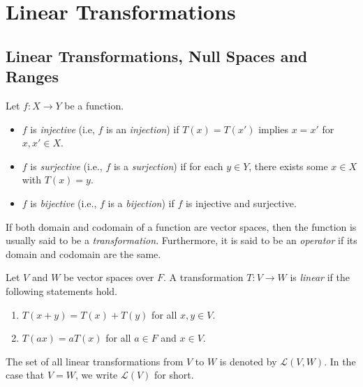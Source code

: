 \chapter{Linear Transformations}
\section{Linear Transformations, Null Spaces and Ranges}
\begin{definition}
  Let $f: X \to Y$ be a function.
  \begin{itemize}
    \item $f$ is \emph{injective} (i.e, $f$ is an \emph{injection})
      if $T(x) = T(x')$ implies $x = x'$ for $x, x' \in X$.
    \item $f$ is \emph{surjective} (i.e., $f$ is a \emph{surjection})
      if for each $y \in Y$, there exists some $x \in X$ with $T(x) = y$.
    \item $f$ is \emph{bijective} (i.e., $f$ is a \emph{bijection})
      if $f$ is injective and surjective.
  \end{itemize}
\end{definition}
\begin{remark}
  If both domain and codomain of a function are vector spaces, then the
  function is usually said to be a \emph{transformation}.
  Furthermore, it is said to be an \emph{operator} if its domain and codomain
  are the same.
\end{remark}

\begin{definition}
  Let $V$ and $W$ be vector spaces over $F$.
  A transformation $T: V \to W$ is \emph{linear} if the following statements
  hold.
  \begin{enumerate}
    \item $T(x + y) = T(x) + T(y)$ for all $x, y \in V$.
    \item $T(ax) = aT(x)$ for all $a \in F$ and $x \in V$.
  \end{enumerate}
  The set of all linear transformations from $V$ to $W$ is denoted by
  $\mathcal{L}(V, W)$.
  In the case that $V = W$, we write $\mathcal{L}(V)$ for short.
\end{definition}

